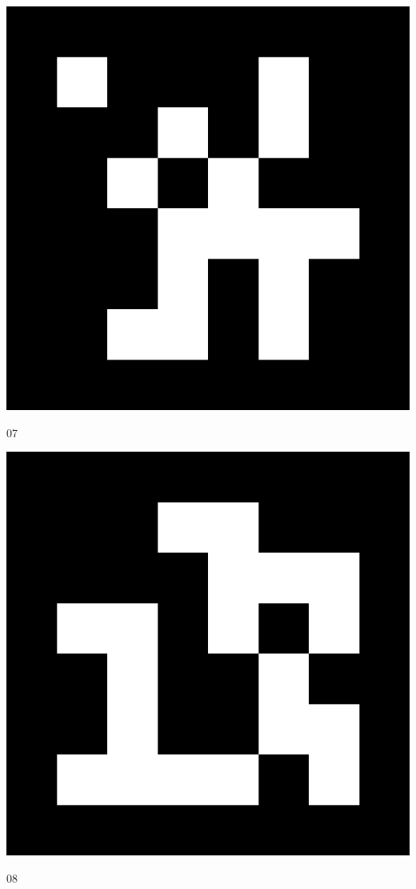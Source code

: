 \newpage
\myemptypage
\vspace{5cm}
\begin{center}
\includegraphics[width=\textwidth, keepaspectratio]{aruco_07.png}
\caption{07}
\end{center}
\newpage
\myemptypage
\vspace{5cm}
\begin{center}
\includegraphics[width=\textwidth, keepaspectratio]{aruco_08.png}
\caption{08}
\end{center}
